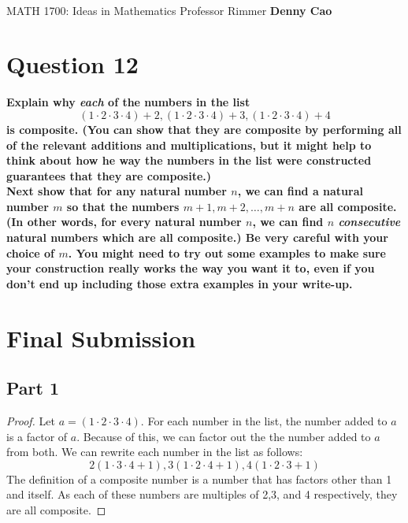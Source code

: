 \documentclass[article, 12pt]{article}
\title{\LARGE\bf{\psetName}}
\author{\name}
\date{\dueDate}
\author{\name}
\date{\dueDate}
\makeatletter
\theoremstyle{definition}
\newcommand{\courseNumber}{MATH 1700}
\newcommand{\courseName}{Ideas in Mathematics}
\newcommand{\professor}{Professor Rimmer}
\newcommand{\name}{Denny Cao}
\renewcommand{\maketitle}{\bgroup\setlength{\parindent}{0pt}
    \begin{flushleft}
        \textbf{\@title} \\ \vskip0.2cm
        \begingroup
            \fontsize{14pt}{12pt}\selectfont
            \courseNumber: \courseName 
            \vskip0.3cm 
            \professor
        \endgroup \vskip0.3cm
        \@date \hfill\rlap{}\bf{\name} \\ \vskip0.1cm
        \hrulefill
    \end{flushleft}\egroup 
}
\makeatother
\begin{document}
    \maketitle
    \thispagestyle{plain}
    
    \section*{Question 12}
    \doublespacing
    \textbf{Explain why \textit{each} of the numbers in the list}
    \[ (1 \cdot 2 \cdot 3 \cdot 4) + 2, (1 \cdot 2 \cdot 3 \cdot 4) + 3, (1 \cdot 2 \cdot 3 \cdot 4) + 4\]
    \textbf{is composite. (You can show that they are composite by performing all of the relevant additions and multiplications, but it might help to think about how he way the numbers in the list were constructed guarantees that they are composite.)}
    \\[12pt]
    \textbf{Next show that for any natural number $n$, we can find a natural number $m$ so that the numbers $m+1,m+2,\dots,m+n$ are all composite. (In other words, for every natural number $n$, we can find $n$ \textit{consecutive} natural numbers which are all composite.) Be very careful with your choice of $m$. You might need to try out some examples to make sure your construction really works the way you want it to, even if you don't end up including those extra examples in your write-up.}
    \pagebreak
    \section*{Final Submission}
    \subsection*{Part 1}
    \begin{proof}
        Let $a = (1 \cdot 2 \cdot 3 \cdot 4)$. For each number in the list, the number added to $a$ is a factor of $a$. Because of this, we can factor out the the number added to $a$ from both. We can rewrite each number in the list as follows:
        \[ 2(1 \cdot 3 \cdot 4 + 1), 3(1 \cdot 2 \cdot 4 + 1), 4(1 \cdot 2 \cdot 3 + 1) \]
        The definition of a composite number is a number that has factors other than 1 and itself. As each of these numbers are multiples of 2,3, and 4 respectively, they are all composite.
    \end{proof}
\end{document}
